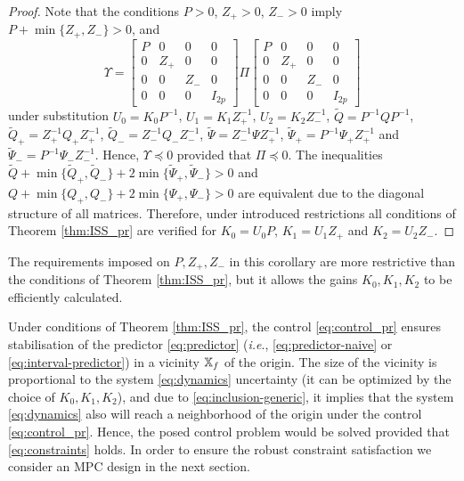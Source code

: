 \begin{proof}
	Note that the conditions $P>0$, $Z_{+}>0$, $Z_{-}>0$ imply $P+\min\{Z_{+},Z_{-}\}>0$,
	and 
	\[
	\Upsilon=\left[\begin{array}{cccc}
	P & 0 & 0 & 0\\
	0 & Z_{+} & 0 & 0\\
	0 & 0 & Z_{-} & 0\\
	0 & 0 & 0 & I_{2p}
	\end{array}\right]\Pi\left[\begin{array}{cccc}
	P & 0 & 0 & 0\\
	0 & Z_{+} & 0 & 0\\
	0 & 0 & Z_{-} & 0\\
	0 & 0 & 0 & I_{2p}
	\end{array}\right]
	\]
	under substitution $U_{0}=K_{0}P^{-1}$, $U_{1}=K_{1}Z_{+}^{-1}$,
	$U_{2}=K_{2}Z_{-}^{-1}$, $\tilde{Q}=P^{-1}QP^{-1}$, $\tilde{Q}_{+}=Z_{+}^{-1}Q_{+}Z_{+}^{-1}$,
	$\tilde{Q}_{-}=Z_{-}^{-1}Q_{-}Z_{-}^{-1}$, $\tilde{\Psi}=Z_{-}^{-1}\Psi Z_{+}^{-1}$,
	$\tilde{\Psi}_{+}=P^{-1}\Psi_{+}Z_{+}^{-1}$ and $\tilde{\Psi}_{-}=P^{-1}\Psi_{-}Z_{-}^{-1}$.
	Hence, $\Upsilon\preceq0$ provided that $\Pi\preceq0$. The inequalities
	$\tilde{Q}+\min\{\tilde{Q}_{+},\tilde{Q}_{-}\}+2\min\{\tilde{\Psi}_{+},\tilde{\Psi}_{-}\}>0$
	and $Q+\min\{Q_{+},Q_{-}\}+2\min\{\Psi_{+},\Psi_{-}\}>0$ are equivalent
	due to the diagonal structure of all matrices. Therefore, under introduced
	restrictions all conditions of Theorem \ref{thm:ISS_pr} are verified
	for $K_{0}=U_{0}P$, $K_{1}=U_{1}Z_{+}$ and $K_{2}=U_{2}Z_{-}$.
\end{proof}
The requirements imposed on $P,Z_{+},Z_{-}$ in this corollary are
more restrictive than the conditions of Theorem \ref{thm:ISS_pr},
but it allows the gains $K_{0},K_{1},K_{2}$ to be efficiently calculated.

Under conditions of Theorem \ref{thm:ISS_pr}, the control \eqref{eq:control_pr}
ensures stabilisation of the predictor \eqref{eq:predictor} (\emph{i.e}.,
\eqref{eq:predictor-naive} or \eqref{eq:interval-predictor}) in
a vicinity $\mathbb{X}_{f}$ of the origin. The size of the vicinity is proportional
to the system \eqref{eq:dynamics} uncertainty (it can be optimized
by the choice of $K_{0},K_{1},K_{2}$), and due to \eqref{eq:inclusion-generic},
it implies that the system \eqref{eq:dynamics} also will reach a
neighborhood of the origin under the control \eqref{eq:control_pr}.
Hence, the posed control problem would be solved provided that \eqref{eq:constraints}
holds. In order to ensure the robust constraint satisfaction we
consider an \gls{MPC} design in the next section.

